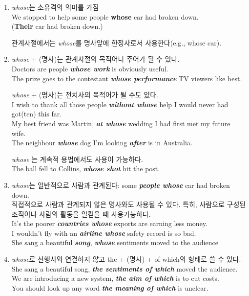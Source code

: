 \documentclass[a4paper]{oblivoir}
\begin{document}
    \begin{enumerate}
        \item \emph{whose}는 소유격의 의미를 가짐
              \\We stopped to help some people \textbf{whose} car had broken down.
              \\(\textbf{Their} car had broken down.)

              관계사절에서는 \emph{whose}를 명사앞에 한정사로서 사용한다(e.g., whose car).
              \\ 
        \item \emph{whose} + (명사)는 관계사절의 목적어나 주어가 될 수 있다. 
              \\ Doctors are people \textbf{\emph{whose work}}  is obviously useful.
              \\ The prize goes to the contestant \textbf{\emph{whose performance}} TV viewers like best.

              \emph{whose} + (명사)는 전치사의 목적어가 될 수도 있다. 
              \\ I wish to thank all those people \textbf{\emph{without whose}} help I would 
              never had got(ten) this far.  
              \\ My best friend was Martin, \textbf{\emph{at whose}} wedding I had first met my future wife.
              \\ The neighbour \textbf{\emph{whose}} dog I'm looking \textbf{\emph{after}} is in Australia.

              \emph{whose} 는 계속적 용법에서도 사용이 가능하다. 
              \\ The ball fell to Collins, \textbf{\emph{whose shot}} hit the post. 

        \item \emph{whose}는 일반적으로 사람과 관계된다: some \textbf{\emph{people whose}} car had broken down.
              \\ 직접적으로 사람과 관계되지 않은 명사와도 사용될 수 있다. 특히, 사람으로 구성된 조직이나 사람의 활동을 일컫을 때 사용가능하다. 
              \\ It's the poorer \textbf{\emph{countries whose}} exports are earning less money.
              \\ I wouldn't fly with an \textbf{\emph{airline whose}} safety record is so bad.
              \\ She sang a beautiful \textbf{\emph{song}}, \textbf{\emph{whose}} sentiments moved to the audience
        \item \emph{whose}로 선행사와 연결하지 않고 the + (명사) + of which의 형태로 쓸 수 있다. 
              \\ She sang a beautiful song, \textbf{\emph{the sentiments of which}} moved the audience.
              \\ We are introducing a new system, \textbf{\emph{the aim of which}} is to cut costs.
              \\ You should look up any word \textbf{\emph{the meaning of which}} is unclear.


\end{enumerate}
\end{document}
